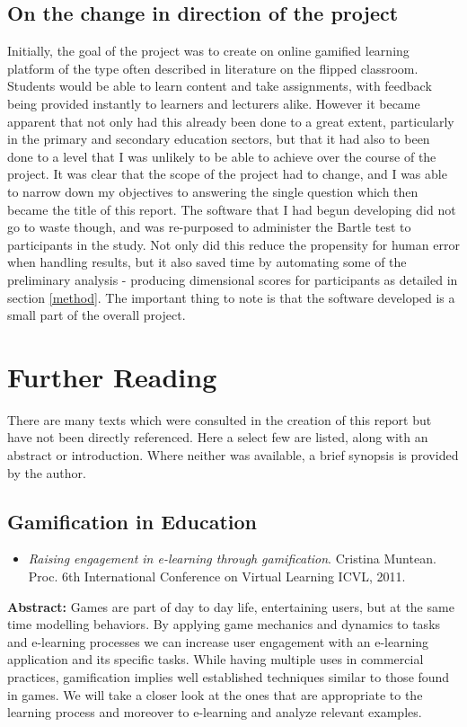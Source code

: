 \documentclass[12pt,a4paper,twoside]{report}
\begin{document}
\section{On the change in direction of the project}
Initially, the goal of the project was to create on online gamified learning platform of the type often described in literature on the flipped classroom. Students would be able to learn content and take assignments, with feedback being provided instantly to learners and lecturers alike. However it became apparent that not only had this already been done to a great extent, particularly in the primary and secondary education sectors, but that it had also to been done to a level that I was unlikely to be able to achieve over the course of the project. It was clear that the scope of the project had to change, and I was able to narrow down my objectives to answering the single question which then became the title of this report. The software that I had begun developing did not go to waste though, and was re-purposed to administer the Bartle test to participants in the study. Not only did this reduce the propensity for human error when handling results, but it also saved time by automating some of the preliminary analysis - producing dimensional scores for participants as detailed in section \ref{method}. The important thing to note is that the software developed is a small part of the overall project.

\chapter{Further Reading}
There are many texts which were consulted in the creation of this report but have not been directly referenced. Here a select few are listed, along with an abstract or introduction. Where neither was available, a brief synopsis is provided by the author. 

\section{Gamification in Education}

\begin{itemize}
	\item \textit{Raising engagement in e-learning through gamification}. Cristina Muntean. Proc. 6th International Conference on Virtual Learning ICVL, 2011.
\end{itemize}

\noindent \textbf{Abstract:} Games are part of day to day life, entertaining users, but at the same time modelling behaviors. By applying game mechanics and dynamics to tasks and e-learning processes we can increase user engagement with an e-learning application and its specific tasks. While having multiple uses in commercial practices, gamification implies well established techniques similar to those found in games. We will take a closer look at the ones that are appropriate to the learning process and moreover to e-learning and analyze relevant examples.
\end{document}
